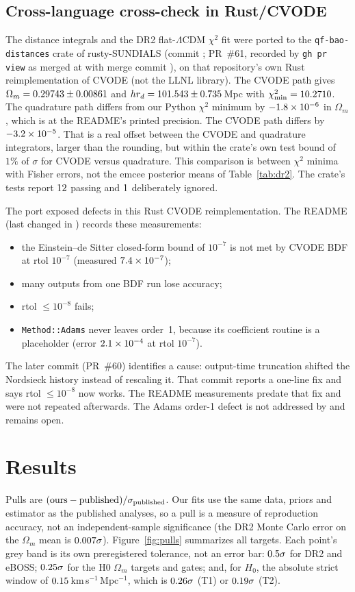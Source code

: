 \documentclass[11pt]{article}
\newcommand{\kms}{km\,s$^{-1}$\,Mpc$^{-1}$}
\begin{document}
\subsection{Cross-language cross-check in Rust/CVODE}\label{sec:rust}
The distance integrals and the DR2 flat-$\Lambda$CDM $\chi^2$ fit were ported to the \texttt{qf-bao-distances} crate of rusty-SUNDIALS
(commit \texttt{\rsPortCommit}; PR~\#61, recorded by \texttt{gh pr view} as merged at \rsPRMergedAt{} with merge commit \texttt{\rsPRMerge}),
on that repository's own Rust reimplementation of CVODE (not the LLNL library). The CVODE path gives $\Omega_m=0.29743\pm0.00861$ and
$hr_d=101.543\pm0.735$\,Mpc with $\chi^2_{\min}=10.2710$. The quadrature path differs from our Python $\chi^2$ minimum by $-1.8\times10^{-6}$ in $\Omega_m$, which is at the README's
printed precision. The CVODE path differs by $-3.2\times10^{-5}$. That is a real offset between the CVODE and quadrature integrators,
larger than the rounding, but within the crate's own test bound of $1\%$ of $\sigma$ for CVODE versus quadrature. This comparison is between
$\chi^2$ minima with Fisher errors, not the emcee posterior means of Table~\ref{tab:dr2}. The crate's tests report $12$ passing
and $1$ deliberately ignored.

The port exposed defects in this Rust CVODE reimplementation. The README (last changed in \texttt{\rsPortCommit}) records these measurements:
\begin{itemize}
\item the Einstein--de Sitter closed-form bound of $10^{-7}$ is not met by CVODE BDF at rtol $10^{-7}$ (measured $7.4\times10^{-7}$);
\item many outputs from one BDF run lose accuracy;
\item rtol $\le10^{-8}$ fails;
\item \texttt{Method::Adams} never leaves order~1, because its coefficient routine is a placeholder (error $2.1\times10^{-4}$ at rtol $10^{-7}$).
\end{itemize}
The later commit \texttt{\rsFixCommit} (PR~\#60) identifies a cause: output-time truncation shifted the Nordsieck history instead of rescaling
it. That commit reports a one-line fix and says rtol $\le10^{-8}$ now works. The README measurements predate that fix and were not repeated
afterwards. The Adams order-1 defect is not addressed by \texttt{\rsFixCommit} and remains open.

\section{Results}
Pulls are $(\text{ours}-\text{published})/\sigma_{\rm published}$. Our fits use the same data, priors and estimator as the published analyses,
so a pull is a measure of reproduction accuracy, not an independent-sample significance (the DR2 Monte Carlo error on the $\Omega_m$ mean is
$0.007\sigma$). Figure~\ref{fig:pulls} summarizes all targets. Each point's grey band is
its own preregistered tolerance, not an error bar: $0.5\sigma$ for DR2 and eBOSS; $0.25\sigma$ for the H0 $\Omega_m$ targets and gates; and, for $H_0$,
the absolute strict window of $0.15$\,\kms, which is $0.26\sigma$ (T1) or $0.19\sigma$ (T2).
\end{document}
